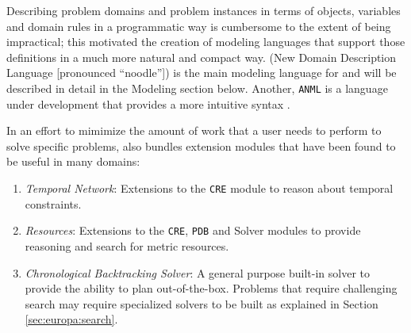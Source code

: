 Describing problem domains and problem instances in terms of objects,
variables and domain rules in a programmatic way is cumbersome to the
extent of being impractical; this motivated the creation of modeling
languages that support those definitions in a much more natural and
compact way. \nd (New Domain Description Language
[pronounced ``noodle'']) \cite{NDDL} is the main modeling language for
\eu and will be described in detail in the Modeling section
below. Another, \texttt{ANML} is a language under development that
provides a more intuitive syntax \cite{smith08}.
  
In an effort to mimimize the amount of work that a user needs to
perform to solve specific problems, \eu also bundles extension
modules that have been found to be useful in many domains:

\begin{enumerate}

\item \textit{Temporal Network}: Extensions to the \texttt{CRE} module to
  reason about temporal constraints.

\item \textit{Resources}: Extensions to the \texttt{CRE}, \texttt{PDB}
  and Solver modules to provide reasoning and search for metric
  resources.

\item \textit{Chronological Backtracking Solver}: A general purpose
  built-in solver to provide the ability to plan out-of-the-box.
  Problems that require challenging search may require specialized
  solvers to be built as explained in Section \ref{sec:europa:search}.

\end{enumerate}


